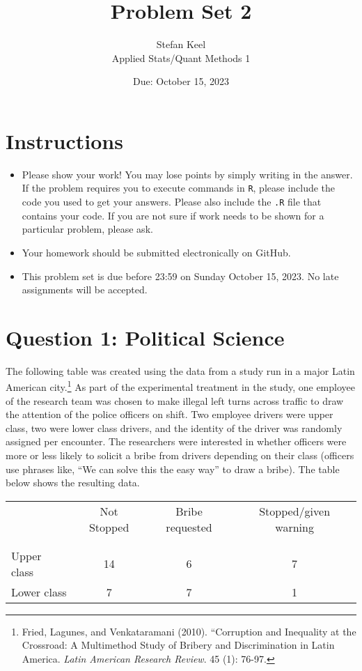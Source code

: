 \documentclass[12pt,letterpaper]{article}
\title{Problem Set 2}
\date{Due: October 15, 2023}
\author{Stefan Keel\\
	Applied Stats/Quant Methods 1}
\begin{document}
	\maketitle
	\section*{Instructions}
\begin{itemize}
	\item Please show your work! You may lose points by simply writing in the answer. If the problem requires you to execute commands in \texttt{R}, please include the code you used to get your answers. Please also include the \texttt{.R} file that contains your code. If you are not sure if work needs to be shown for a particular problem, please ask.
	\item Your homework should be submitted electronically on GitHub.
	\item This problem set is due before 23:59 on Sunday October 15, 2023. No late assignments will be accepted.

\end{itemize}

	
	\vspace{.5cm}
	\section*{Question 1: Political Science}
		\vspace{.25cm}
	The following table was created using the data from a study run in a major Latin American city.\footnote{Fried, Lagunes, and Venkataramani (2010). ``Corruption and Inequality at the Crossroad: A Multimethod Study of Bribery and Discrimination in Latin America. \textit{Latin American Research Review}. 45 (1): 76-97.} As part of the experimental treatment in the study, one employee of the research team was chosen to make illegal left turns across traffic to draw the attention of the police officers on shift. Two employee drivers were upper class, two were lower class drivers, and the identity of the driver was randomly assigned per encounter. The researchers were interested in whether officers were more or less likely to solicit a bribe from drivers depending on their class (officers use phrases like, ``We can solve this the easy way'' to draw a bribe). The table below shows the resulting data.

\newpage
\begin{table}[h!]
	\centering
	\begin{tabular}{l | c c c }
		& Not Stopped & Bribe requested & Stopped/given warning \\
		\\[-1.8ex] 
		\hline \\[-1.8ex]
		Upper class & 14 & 6 & 7 \\
		Lower class & 7 & 7 & 1 \\
		\hline
	\end{tabular}
\end{table}
\end{document}

